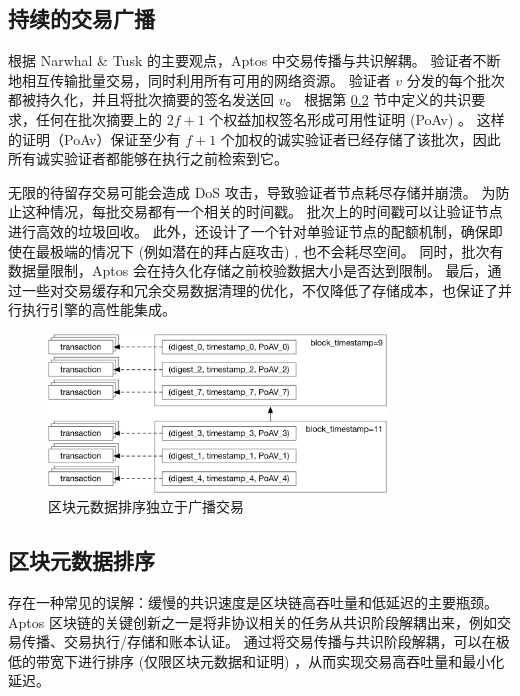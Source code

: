 \documentclass{article}
\begin{document}
\subsection{持续的交易广播}
\label{continuous_txn_dissemination}

根据 Narwhal \& Tusk \cite{narwhal_tusk} 的主要观点，Aptos 中交易传播与共识解耦。 验证者不断地相互传输批量交易，同时利用所有可用的网络资源。 验证者 $v$ 分发的每个批次都被持久化，并且将批次摘要的签名发送回 $v$。 根据第 \ref{subsec:block_metadata_ordering} 节中定义的共识要求，任何在批次摘要上的 $2f+1$  个权益加权签名形成可用性证明 (PoAv) 。 这样的证明（PoAv）保证至少有 $f+1$  个加权的诚实验证者已经存储了该批次，因此所有诚实验证者都能够在执行之前检索到它。

无限的待留存交易可能会造成 DoS 攻击，导致验证者节点耗尽存储并崩溃。 为防止这种情况，每批交易都有一个相关的时间戳。 批次上的时间戳可以让验证节点进行高效的垃圾回收。 此外，还设计了一个针对单验证节点的配额机制，确保即使在最极端的情况下 (例如潜在的拜占庭攻击) , 也不会耗尽空间。 同时，批次有数据量限制，Aptos 会在持久化存储之前校验数据大小是否达到限制。 最后，通过一些对交易缓存和冗余交易数据清理的优化，不仅降低了存储成本，也保证了并行执行引擎的高性能集成。


\begin{figure}
\centering
\includegraphics[width=0.8\textwidth]{ordering.pdf}
\caption{\label{fig:block}区块元数据排序独立于广播交易}
\end{figure}

\subsection{区块元数据排序}
\label{subsec:block_metadata_ordering}

存在一种常见的误解：缓慢的共识速度是区块链高吞吐量和低延迟的主要瓶颈。 Aptos 区块链的关键创新之一是将非协议相关的任务从共识阶段解耦出来，例如交易传播、交易执行/存储和账本认证。 通过将交易传播与共识阶段解耦，可以在极低的带宽下进行排序 (仅限区块元数据和证明) ，从而实现交易高吞吐量和最小化延迟。
\end{document}

